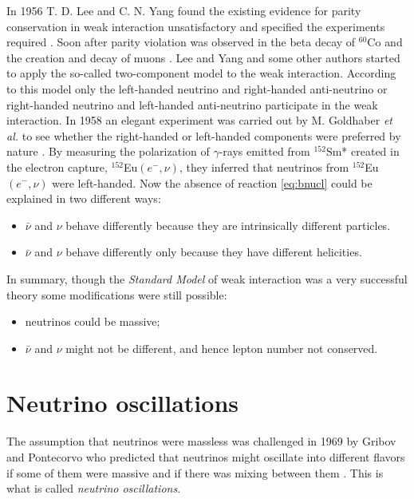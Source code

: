 In 1956 T. D. Lee and C. N. Yang found the existing evidence for
parity conservation in weak interaction unsatisfactory and specified
the experiments required \cite{Lee56}. Soon after parity violation was
observed in the beta decay of $^{60}$Co \cite{Wu57} and the creation
and decay of muons \cite{Gar57,Fri57}. Lee and Yang \cite{Lee57} and
some other authors \cite{Sal57, Lan57} started to apply the so-called
two-component model \cite{Wey29} to the weak interaction. According to
this model only the left-handed neutrino and right-handed
anti-neutrino or right-handed neutrino and left-handed anti-neutrino
participate in the weak interaction. In 1958 an elegant experiment was
carried out by M. Goldhaber \textit{et al.} to see whether the
right-handed or left-handed components were preferred by nature
\cite{Gol58}. By measuring the polarization of $\gamma$-rays emitted
from $^{152}$Sm* created in the electron capture,
$^{152}$Eu$(e^-,\nu)$, they inferred that neutrinos from
$^{152}$Eu$(e^-,\nu)$ were left-handed. Now the absence of reaction
\ref{eq:bnucl} could be explained in two different ways:
\begin{itemize}
\item $\bar{\nu}$ and $\nu$ behave differently because they are
intrinsically different particles.
\item $\bar{\nu}$ and $\nu$ behave differently only because they have
different helicities.
\end{itemize}

In summary, though the \emph{Standard Model} of weak interaction was a
very successful theory some modifications were still possible:
\begin{itemize}
\item neutrinos could be massive;
\item $\bar{\nu}$ and $\nu$ might not be different, and hence lepton
number not conserved.
\end{itemize}


\section{Neutrino oscillations}
\label{sec:osci}
The assumption that neutrinos were massless was challenged in 1969 by
Gribov and Pontecorvo who predicted that neutrinos might oscillate
into different flavors if some of them were massive and if there was
mixing between them \cite{Gri69}. This is what is called
\emph{neutrino oscillations}.

